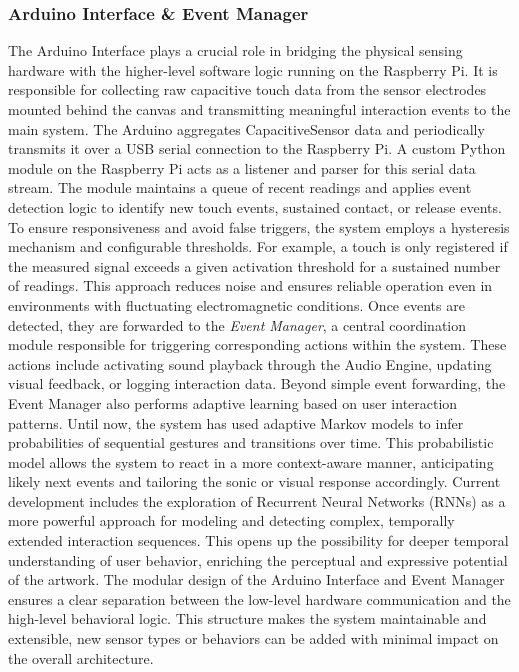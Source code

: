 \documentclass{article}
\begin{document}
\subsubsection{Arduino Interface \& Event Manager}
The Arduino Interface plays a crucial role in bridging the physical sensing hardware with the higher-level software logic running on the Raspberry Pi. It is responsible for collecting raw capacitive touch data from the sensor electrodes mounted behind the canvas and transmitting meaningful interaction events to the main system. \newline 
The Arduino aggregates CapacitiveSensor data and periodically transmits it over a USB serial connection to the Raspberry Pi. A custom Python module on the Raspberry Pi acts as a listener and parser for this serial data stream. The module maintains a queue of recent readings and applies event detection logic to identify new touch events, sustained contact, or release events. \newline 
To ensure responsiveness and avoid false triggers, the system employs a hysteresis mechanism and configurable thresholds. For example, a touch is only registered if the measured signal exceeds a given activation threshold for a sustained number of readings. This approach reduces noise and ensures reliable operation even in environments with fluctuating electromagnetic conditions. \newline 
Once events are detected, they are forwarded to the \textit{Event Manager}, a central coordination module responsible for triggering corresponding actions within the system. These actions include activating sound playback through the Audio Engine, updating visual feedback, or logging interaction data. \newline 
Beyond simple event forwarding, the Event Manager also performs adaptive learning based on user interaction patterns. Until now, the system has used adaptive Markov models to infer probabilities of sequential gestures and transitions over time. This probabilistic model allows the system to react in a more context-aware manner, anticipating likely next events and tailoring the sonic or visual response accordingly. \newline 
Current development includes the exploration of Recurrent Neural Networks (RNNs) as a more powerful approach for modeling and detecting complex, temporally extended interaction sequences. This opens up the possibility for deeper temporal understanding of user behavior, enriching the perceptual and expressive potential of the artwork. \newline 
The modular design of the Arduino Interface and Event Manager ensures a clear separation between the low-level hardware communication and the high-level behavioral logic. This structure makes the system maintainable and extensible, new sensor types or behaviors can be added with minimal impact on the overall architecture.
\end{document}
